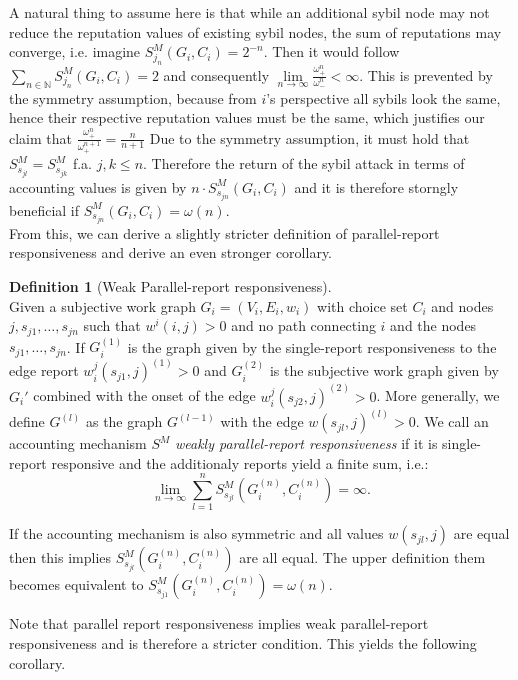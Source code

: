 \documentclass[11pt,a4paper]{report}
\theoremstyle{definition}
\newtheorem{definition}{Definition}[section]
\theoremstyle{theorem}
\theoremstyle{proposition}
\theoremstyle{corollary}
\theoremstyle{lemma}
\theoremstyle{example}
\theoremstyle{remark}
\begin{document}
\noindent{}A natural thing to assume here is that while an additional sybil node may not reduce the reputation values of existing sybil nodes, the sum of reputations may converge, i.e. imagine $S^M_{j_n}(G_i,C_i)=2^{-n}$. Then it would follow $\sum\limits_{n\in\mathbb{N}}S^M_{j_n}(G_i,C_i)=2$ and consequently $\lim\limits_{n\rightarrow\infty}\frac{\omega^n_{+}}{\omega^n_{-}}<\infty$. This is prevented by the symmetry assumption, because from $i$'s perspective all sybils look the same, hence their respective reputation values must be the same, which justifies our claim that $\frac{\omega_{+}^n}{\omega_{+}^{n+1}}=\frac{n}{n+1}$ Due to the symmetry assumption, it must hold that $S^M_{s_{jl}}=S^M_{s_{jk}}$ f.a. $j,k\leq{}n$. Therefore the return of the sybil attack in terms of accounting values is given by $n\cdot{}S^M_{s_{jn}}(G_i,C_i)$ and it is therefore storngly beneficial if $S^M_{s_{jn}}(G_i,C_i)=\omega(n)$. \vspace{1em}\\ 

\noindent{}From this, we can derive a slightly stricter definition of parallel-report responsiveness and derive an even stronger corollary. 

\begin{definition}[Weak Parallel-report responsiveness]\ \\
Given a subjective work graph $G_i=(V_i,E_i,w_i)$ with choice set $C_i$ and nodes $j,s_{j1},\ldots{},s_{jn}$ such that $w^i(i,j)>0$ and no path connecting $i$ and the nodes $s_{j1},\ldots{},s_{jn}$. If $G_i^{(1)}$ is the graph given by the single-report responsiveness to the edge report $w^j_i(s_{j1},j)^{(1)}>0$ and $G_i^{(2)}$ is the subjective work graph given by $G_i'$ combined with the onset of the edge $w^j_i(s_{j2},j)^{(2)}>0$. More generally, we define $G^{(l)}$ as the graph $G^{(l-1)}$ with the edge $w(s_{jl},j)^{(l)}>0.$ We call an accounting mechanism $S^M$ {\it weakly parallel-report responsiveness} if it is single-report responsive and the additionaly reports yield a finite sum, i.e.:
\[
\lim\limits_{n\rightarrow\infty}\sum\limits_{l=1}^{n}S^M_{s_{jl}}(G_i^{(n)},C_i^{(n)})=\infty .
\] 

\noindent{}If the accounting mechanism is also symmetric and all values $w(s_{jl},j)$ are equal then this implies $S^M_{s_{jl}}(G_i^{(n)},C_i^{(n)})$ are all equal. The upper definition them becomes equivalent to $S^M_{s_{j1}}(G_i^{(n)},C_i^{(n)}) = \omega(n)$.
\end{definition}

\noindent{}Note that parallel report responsiveness implies weak parallel-report responsiveness and is therefore a stricter condition. This yields the following corollary. 
\end{document}
